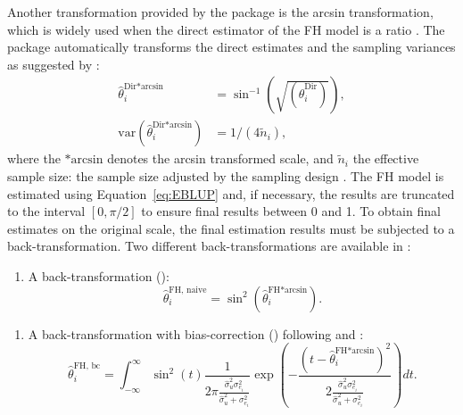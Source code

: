 Another transformation provided by the  package is the arcsin transformation, which is widely used when the direct estimator of the FH model is a ratio
\citep{Casas2016, Schmid2017}. The  package automatically transforms the
direct estimates and the sampling variances as suggested by \citet{Jiang2001}:
%
\begin{align*}
\hat{\theta}_{i}^{\text{Dir*arcsin}} &=
\sin^{-1}\left(\sqrt{ \left(\hat{\theta}_{i}^{\text{Dir}}\right)}\right), \\
\text{var}\left(\hat{\theta}_{i}^{\text{Dir*arcsin}}\right) &= 1 / \left(4 \tilde{n}_i\right),
\end{align*}
%
where the $\text{*arcsin}$ denotes the arcsin transformed scale, and $\tilde{n}_i$
the effective sample size: the sample size adjusted by
the sampling design \citep{Jiang2001}. The FH model is estimated using
Equation~\ref{eq:EBLUP} and, if necessary, the results are truncated to the interval
$[0, \pi / 2]$ to ensure final results between 0 and 1. To obtain final
estimates on the original scale, the final estimation results must be subjected
to a back-transformation. Two different back-transformations are available in
:
\begin{enumerate}
	\item A  back-transformation ():
	\begin{equation*}
	\hat{\theta}^{\text{FH, naive}}_{i} =
	\sin^2 \left(\hat{\theta}^{\text{FH*arcsin}}_{i}\right).
	\end{equation*}
\end{enumerate}
\begin{enumerate}[resume]
	\item A back-transformation with bias-correction () following
	\citet{Sugawasa2017} and \citet{Hadam2020}:
	\begin{equation*}
	\hat{\theta}^{\text{FH, bc}}_{i} = \int_{- \infty}^{\infty} \sin^2 \left(t\right)
	\frac{1}{2 \pi \frac{\hat{\sigma}^2_u \sigma^2_{e_i}}{\hat{\sigma}^2_u +
			\sigma^2_{e_i}}} \exp \left( - \frac{\left(t - \hat{\theta}^{\text{FH*arcsin}}_i
		\right)^2}{2 \frac{\hat{\sigma}^2_u \sigma^2_{e_i}}{\hat{\sigma}^2_u +
			\sigma^2_{e_i}}} \right) dt.
	\end{equation*}
	
\end{enumerate}

